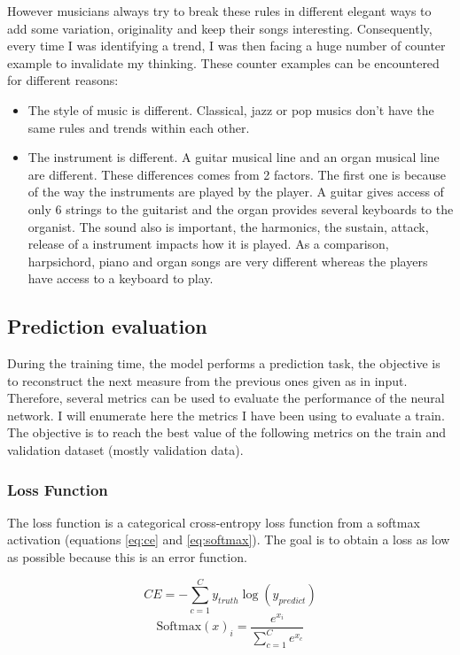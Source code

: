 \documentclass[12pt]{report}
\begin{document}
However musicians always try to break these rules in different elegant ways to add some variation, originality and keep their songs interesting.
Consequently, every time I was identifying a trend, I was then facing a huge number of counter example to invalidate my thinking.
These counter examples can be encountered for different reasons:
\begin{itemize}
    \item The style of music is different.
    Classical, jazz or pop musics don't have the same rules and trends within each other.
    \item The instrument is different.
    A guitar musical line and an organ musical line are different.
    These differences comes from 2 factors.
    The first one is because of the way the instruments are played by the player.
    A guitar gives access of only 6 strings to the guitarist and the organ provides several keyboards to the organist.
    The sound also is important, the harmonics, the sustain, attack, release of a instrument impacts how it is played.
    As a comparison, harpsichord, piano and organ songs are  very different whereas the players have access to a keyboard to play.
\end{itemize}

\subsection{Prediction evaluation}

During the training time, the model performs a prediction task, the objective is to reconstruct the next measure from the previous ones given as in input.
Therefore, several metrics can be used to evaluate the performance of the neural network.
I will enumerate here the metrics I have been using to evaluate a train.
The objective is to reach the best value of the following metrics on the train and validation dataset (mostly validation data).

\subsubsection{Loss Function}

The loss function is a categorical cross-entropy loss function from a softmax activation (equations \ref{eq:ce} and \ref{eq:softmax}).
The goal is to obtain a loss as low as possible because this is an error function.

\begin{equation}
    CE = - \sum_{c=1}^{C} y_{truth} \log(y_{predict})
    \label{eq:ce}
\end{equation}
\begin{equation}
    \text{Softmax}(x)_{i} = \frac{e^{x_i}}{\sum_{c=1}^{C} e^{x_{c}}}
    \label{eq:softmax}
\end{equation}
\end{document}
